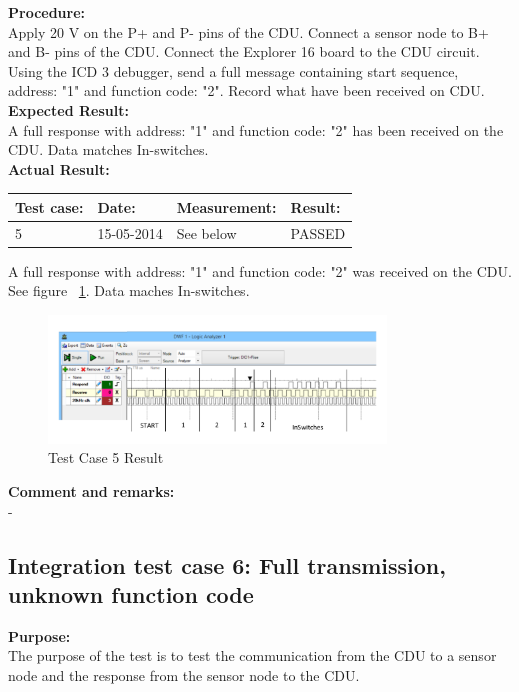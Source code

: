 \textbf{Procedure:}\\
Apply 20 V on the P+ and P- pins of the CDU. Connect a sensor node to B+ and B- pins of the CDU. Connect the Explorer 16 board to the CDU circuit. Using the ICD 3 debugger, send a full message containing start sequence, address: "1" and function code: "2". Record what have been received on CDU.\\

\textbf{Expected Result:}\\
A full response with address: "1" and function code: "2" has been received on the CDU. Data matches In-switches.\\

\textbf{Actual Result:}\\
\begin{table}[H]
\centering
\begin{tabular}{|p{2cm}|p{2cm}|p{3cm}|p{2cm}|}\hline
\textbf{Test case:} & \textbf{Date:} & \textbf{Measurement:} & \textbf{Result:} \\ \hline
5 & 15-05-2014 & See below & PASSED \\ \hline
\end{tabular}
\end{table}
A full response with address: "1" and function code: "2" was received on the CDU. See figure ~\ref{fig:InteTestCase5}. Data maches In-switches.\\
\begin{figure}[H]
\centering
\includegraphics[width=0.8\textwidth]{billeder/intetestcase5}
\caption{Test Case 5 Result}
\label{fig:InteTestCase5}
\end{figure}


\textbf{Comment and remarks:}\\
-\\

\subsection{Integration test case 6: Full transmission, unknown function code}
\textbf{Purpose:}\\
The purpose of the test is to test the communication from the CDU to a sensor node and the response from the sensor node to the CDU.\\

